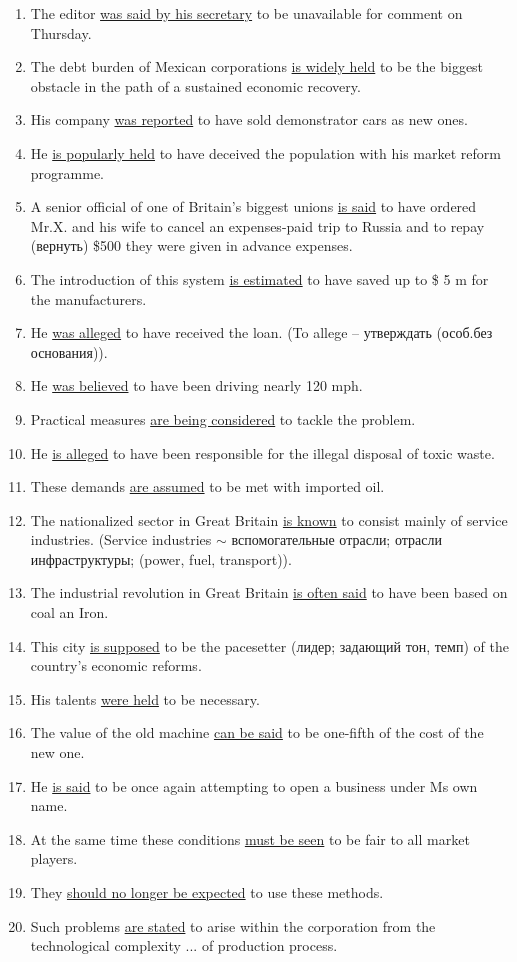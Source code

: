 \documentclass[main.tex]{subfiles}
\begin{document}
\begin{enumerate}[nosep,leftmargin=*]
	\item The editor \uline{was said by his secretary} to be unavailable for comment on Thursday.
	\item The debt burden of Mexican corporations \uline{is widely held} to be the biggest obstacle in the path of a sustained economic recovery.
	\item His company \uline{was reported} to have sold demonstrator cars as new ones.
	\item He \uline{is popularly held} to have deceived the population with his market reform programme.
	\item A senior official of one of Britain's biggest unions \uline{is said} to have ordered Mr.X. and his wife to cancel an expenses-paid trip to Russia and to repay (вернуть) \$500 they were given in advance expenses.
	\item The introduction of this system \uline{is estimated} to have saved up to \$ 5 m for the manufacturers.
	\item He \uline{was alleged} to have received the loan. (To allege -- утверждать (особ.без основания)).
	\item He \uline{was believed} to have been driving nearly 120 mph.
	\item Practical measures \uline{are being considered} to tackle the problem.
	\item He \uline{is alleged} to have been responsible for the illegal disposal of toxic waste.
	\item These demands \uline{are assumed} to be met with imported oil.
	\item The nationalized sector in Great Britain \uline{is known} to consist mainly of service industries. (Service industries $\sim$ вспомогательные отрасли; отрасли инфраструктуры; (power, fuel, transport)).
	\item The industrial revolution in Great Britain \uline{is often said} to have been based on coal an Iron.
	\item This city \uline{is supposed} to be the pacesetter (лидер; задающий тон, темп) of the country's economic reforms.
	\item His talents \uline{were held} to be necessary.
	\item The value of the old machine \uline{can be said} to be one-fifth of the cost of the new one.
	\item He \uline{is said} to be once again attempting to open a business under Ms own name.
	\item At the same time these conditions \uline{must be seen} to be fair to all market players.
	\item They \uline{should no longer be expected} to use these methods.
	\item Such problems \uline{are stated} to arise within the corporation from the technological complexity ... of production process.
\end{enumerate}
\ 
\end{document}
